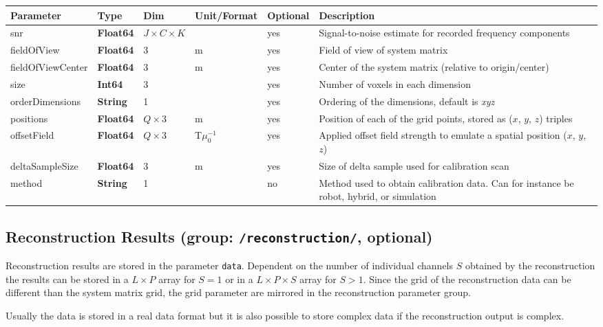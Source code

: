 \documentclass[landscape,a4paper]{article} %
\newcommand{\inl}[1]{\lstinline[columns=fixed]{#1}}
\newcommand{\inltab}[1]{{\ttfamily\bfseries\color{blue}#1}}
\newcommand{\inlvar}[1]{{\ttfamily#1}}
\begin{document}
\noindent \begin{tabularx}{\columnwidth}{llp{3cm}llX} 
\textbf{Parameter} & \textbf{Type} & \textbf{Dim} & \textbf{Unit/Format} & \textbf{Optional} & \textbf{Description} \\ \hline 
\inlvar{snr} & \inltab{Float64} & $J \times C \times K$ &  & yes & Signal-to-noise estimate for recorded frequency components \\ \hline
\inlvar{fieldOfView} & \inltab{Float64} & $3$ & m & yes & Field of view of system matrix \\ \hline
\inlvar{fieldOfViewCenter} & \inltab{Float64} & $3$ & m & yes & Center of the system matrix (relative to origin/center) \\ \hline
\inlvar{size} & \inltab{Int64} & $3$ &  & yes & Number of voxels in each dimension \\ \hline
\inlvar{orderDimensions} & \inltab{String} & 1 & & yes & Ordering of the dimensions, default is \textit{xyz} \\ \hline
\inlvar{positions} & \inltab{Float64} & $Q \times 3$ & m & yes & Position of each of the grid points, stored as ($x$, $y$, $z$) triples \\ \hline
\inlvar{offsetField} & \inltab{Float64} & $Q \times 3$ & T$\mu_0^{-1}$ & yes & Applied offset field strength to emulate a spatial position ($x$, $y$, $z$) \\ \hline
\inlvar{deltaSampleSize} & \inltab{Float64} & 3 & m & yes & Size of delta sample used for calibration scan \\ \hline
\inlvar{method} & \inltab{String} & 1 & & no & Method used to obtain calibration data. Can for instance be robot, hybrid, or simulation \\ \hline
\end{tabularx}


\subsection{Reconstruction Results (group: \inl{/reconstruction/}, optional)}

\begin{multicols}{2}
Reconstruction results are stored in the parameter \inl{data}. Dependent on the number of individual channels $S$ obtained by the reconstruction the results can be stored in a $L\times P$ array for $S=1$ or in a $L\times P \times S$ array for $S>1$. Since the grid of the reconstruction data can be different than the system matrix grid, the grid parameter are mirrored in the reconstruction parameter group. 

Usually the data is stored in a real data format but it is also possible to store complex data if the reconstruction output is complex.
\end{multicols}
\end{document}
